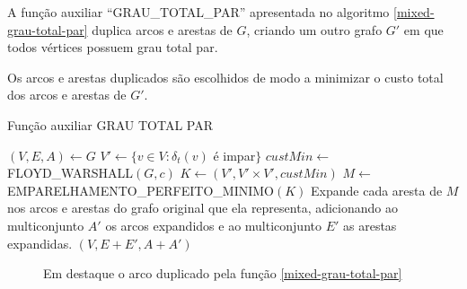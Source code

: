     A função auxiliar ``GRAU\_TOTAL\_PAR'' apresentada no algoritmo \ref{mixed-grau-total-par} duplica arcos e arestas de $G$, criando um outro grafo $G'$ em que todos vértices possuem grau total par.

    Os arcos e arestas duplicados são escolhidos de modo a minimizar o custo total dos arcos e arestas de $G'$.
    
    \begin{algorithm}
        \caption{Função auxiliar GRAU TOTAL PAR}
        \label{mixed-grau-total-par}
        \begin{algorithmic}[1]
            \State $(V, E, A) \gets G$
            \State $V' \gets \{v \in V : \delta_t(v)$ é impar$\}$
            \State $custMin \gets $ FLOYD\_WARSHALL$(G, c)$ 
            \State $K \gets (V', V' \times V', custMin)$ 
            \State $M \gets $ EMPARELHAMENTO\_PERFEITO\_MINIMO$(K)$
            \State Expande cada aresta de $M$ nos arcos e arestas do grafo original que ela representa, adicionando ao multiconjunto $A'$ os arcos expandidos e ao multiconjunto $E'$ as arestas expandidas.
            \State \Return $(V, E + E', A + A')$ 
        \EndFunction
        \end{algorithmic}
    \end{algorithm}

    \begin{figure}[H]
        \centering
        \caption{Em destaque o arco duplicado pela função \ref{mixed-grau-total-par}}
        \label{mixed-exemplo-grau-total}
    \end{figure}

